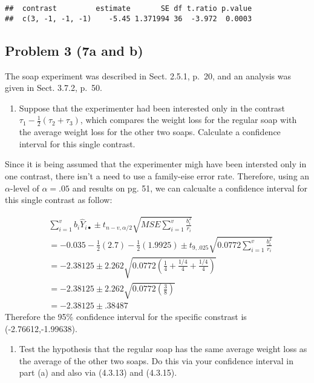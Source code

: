 \documentclass[12pt,]{article}
\providecommand{\tightlist}{%
  \setlength{\itemsep}{0pt}\setlength{\parskip}{0pt}}
\begin{document}
\begin{verbatim}
##  contrast         estimate       SE df t.ratio p.value
##  c(3, -1, -1, -1)    -5.45 1.371994 36  -3.972  0.0003
\end{verbatim}

\subsection{Problem 3 (7a and b)}\label{problem-3-7a-and-b}

The soap experiment was described in Sect. 2.5.1, p.~20, and an analysis
was given in Sect. 3.7.2, p.~50.

\begin{enumerate}
\def\labelenumi{(\alph{enumi})}
\tightlist
\item
  Suppose that the experimenter had been interested only in the contrast
  \(\tau_1 - \frac{1}{2}(\tau_2 + \tau_3)\), which compares the weight
  loss for the regular soap with the average weight loss for the other
  two soaps. Calculate a confidence interval for this single contrast.
\end{enumerate}

Since it is being assumed that the experimenter migh have been intersted
only in one contrast, there isn't a need to use a family-eise error
rate. Therefore, using an \(\alpha\)-level of \(\alpha=.05\) and results
on pg. 51, we can calcualte a confidence interval for this single
contrast as follow:

\[
\begin{aligned}
& \sum_{i=1}^v b_i\hat{Y}_{i\bullet} \pm t_{n-v,\alpha/2} \sqrt{MSE \sum_{i=1}^v \frac{b_i^2}{r_i}}\\
&= -0.035- \frac{1}{2}(2.7) - \frac{1}{2}(1.9925) \pm t_{9,.025}
 \sqrt{0.0772 \sum_{i=1}^v \frac{b_i^2}{r_i}}\\
&= -2.38125 \pm 2.262\sqrt{0.0772 \left( \frac{1}{4} + \frac{1/4}{4} + \frac{1/4}{4} \right)}\\
&= -2.38125 \pm 2.262\sqrt{0.0772 \left( \frac{3}{8}  \right)}\\
&= -2.38125 \pm .38487
\end{aligned}
\] Therefore the 95\% confidence interval for the specific constrast is
(-2.76612,-1.99638).

\begin{enumerate}
\def\labelenumi{(\alph{enumi})}
\setcounter{enumi}{1}
\tightlist
\item
  Test the hypothesis that the regular soap has the same average weight
  loss as the average of the other two soaps. Do this via your
  confidence interval in part (a) and also via (4.3.13) and (4.3.15).
\end{enumerate}
\end{document}

